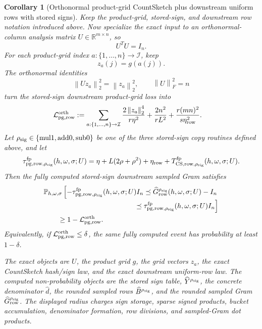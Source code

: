 \documentclass[11pt]{article}
\newcommand{\R}{\mathbb{R}}
\newcommand{\Prob}{\mathbb{P}}
\newcommand{\Frob}[1]{\left\lVert #1\right\rVert_F}
\newcommand{\Norm}[1]{\left\lVert #1\right\rVert_2}
\newcommand{\I}{I}
\newtheorem{corollary}[theorem]{Corollary}
\theoremstyle{remark}
\begin{document}
\begin{corollary}[Orthonormal product-grid CountSketch plus downstream uniform rows with stored signs]
Keep the product-grid, stored-sign, and downstream row notation introduced
above.  Now specialize the exact input to an orthonormal-column analysis
matrix \(U\in\R^{m\times n}\), so
\[
  U^TU=\I_n .
\]
For each product-grid index \(a:\{1,\ldots,n\}\to\mathcal I\), keep
\[
  z_a(j)=g(a(j)).
\]
The orthonormal identities
\[
  \Norm{Uz_a}^2=\Norm{z_a}^2,
  \qquad
  \Frob{U}^2=n
\]
turn the stored-sign downstream product-grid loss into
\[
\begin{aligned}
  \mathcal L_{\rm pg,row}^{\rm orth}
  &:=
  \sum_{a:\{1,\ldots,n\}\to\mathcal I}
    \frac{2\Norm{z_a}^4}{r\eta^2}
  +
    \frac{2n^2}{rL^2}
  +
    \frac{r(mn)^2}{s\eta_{\rm row}^2}.
\end{aligned}
\]
Let \(\rho_{\rm sig}\in\{\mathrm{mul1},\mathrm{add0},\mathrm{sub0}\}\) be
one of the three stored-sign copy routines defined above, and let
\[
  \tau_{{\rm pg,row},\rho_{\rm sig}}^{\rm fp}(h,\omega,\sigma;U)
  =
  \eta+L(2\rho+\rho^2)
  +\eta_{\rm row}
  +T_{{\rm CS,row},\rho_{\rm sig}}^{\rm fp}(h,\omega,\sigma;U).
\]
Then the fully computed stored-sign downstream sampled Gram satisfies
\[
\begin{aligned}
&\Prob_{h,\omega,\sigma}
  \left[
    -\tau_{{\rm pg,row},\rho_{\rm sig}}^{\rm fp}(h,\omega,\sigma;U)\I_n
    \preceq
    \widehat G_{\rm row}^{\rho_{\rm sig}}(h,\omega,\sigma;U)-\I_n
  \right.
\\[-2pt]
&\left.\hspace{4.5cm}
    \preceq
    \tau_{{\rm pg,row},\rho_{\rm sig}}^{\rm fp}(h,\omega,\sigma;U)\I_n
  \right]
\\
&\qquad\ge
  1-\mathcal L_{\rm pg,row}^{\rm orth}.
\end{aligned}
\]
Equivalently, if \(\mathcal L_{\rm pg,row}^{\rm orth}\le\delta\), the same
fully computed event has probability at least \(1-\delta\).

The exact objects are \(U\), the product grid \(g\), the grid vectors \(z_a\),
the exact CountSketch hash/sign law, and the exact downstream uniform-row law.
The computed non-probability objects are the stored sign table,
\(\widehat Y^{\rho_{\rm sig}}\), the concrete denominator \(\widehat d\),
the rounded sampled rows \(\widehat B^{\rho_{\rm sig}}\), and the rounded
sampled Gram \(\widehat G_{\rm row}^{\rho_{\rm sig}}\).  The displayed
radius charges sign storage, sparse signed products, bucket accumulation,
denominator formation, row divisions, and sampled-Gram dot products.


\end{corollary}
\end{document}
